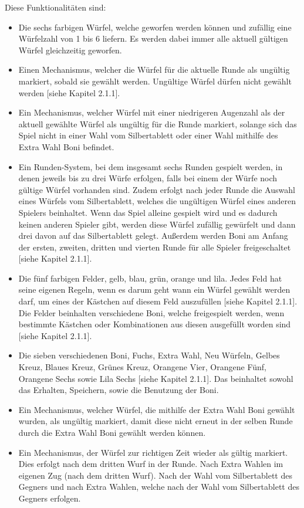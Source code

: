 Diese Funktionalitäten sind:
\begin{itemize}
\item Die sechs farbigen Würfel, welche geworfen werden können und zufällig eine Würfelzahl von 1 bis 6 liefern. Es werden dabei immer alle aktuell gültigen Würfel gleichzeitig geworfen.

\item Einen Mechanismus, welcher die Würfel für die aktuelle Runde als ungültig markiert, sobald sie gewählt werden. Ungültige Würfel dürfen nicht gewählt werden [siehe Kapitel 2.1.1].

\item Ein Mechanismus, welcher Würfel mit einer niedrigeren Augenzahl als der aktuell gewählte Würfel als ungültig für die Runde markiert, solange sich das Spiel nicht in einer Wahl vom Silbertablett oder einer Wahl mithilfe des Extra Wahl Boni befindet.

\item Ein Runden-System, bei dem insgesamt sechs Runden gespielt werden, in denen jeweils bis zu drei Würfe erfolgen, falls bei einem der Würfe noch gültige Würfel vorhanden sind. Zudem erfolgt nach jeder Runde die Auswahl eines Würfels vom Silbertablett, welches die ungültigen Würfel eines anderen Spielers beinhaltet. Wenn das Spiel alleine gespielt wird und es dadurch keinen anderen Spieler gibt, werden diese Würfel zufällig gewürfelt und dann drei davon auf das Silbertablett gelegt. Außerdem werden Boni am Anfang der ersten, zweiten, dritten und vierten Runde für alle Spieler freigeschaltet [siehe Kapitel 2.1.1].

\item Die fünf farbigen Felder, gelb, blau, grün, orange und lila. Jedes Feld hat seine eigenen Regeln, wenn es darum geht wann ein Würfel gewählt werden darf, um eines der Kästchen auf diesem Feld auszufüllen [siehe Kapitel 2.1.1]. Die Felder beinhalten verschiedene Boni, welche freigespielt werden, wenn bestimmte Kästchen oder Kombinationen aus diesen ausgefüllt worden sind [siehe Kapitel 2.1.1].

\item Die sieben verschiedenen Boni, Fuchs, Extra Wahl, Neu Würfeln, Gelbes Kreuz, Blaues Kreuz, Grünes Kreuz, Orangene Vier, Orangene Fünf, Orangene Sechs sowie Lila Sechs [siehe Kapitel 2.1.1]. Das beinhaltet sowohl das Erhalten, Speichern, sowie die Benutzung der Boni.

\item Ein Mechanismus, welcher Würfel, die mithilfe der Extra Wahl Boni gewählt wurden, als ungültig markiert, damit diese nicht erneut in der selben Runde durch die Extra Wahl Boni gewählt werden können.

\item Ein Mechanismus, der Würfel zur richtigen Zeit wieder als gültig markiert. Dies erfolgt nach dem dritten Wurf in der Runde. Nach Extra Wahlen im eigenen Zug (nach dem dritten Wurf). Nach der Wahl vom Silbertablett des Gegners und nach Extra Wahlen, welche nach der Wahl vom Silbertablett des Gegners erfolgen.
\end{itemize}
